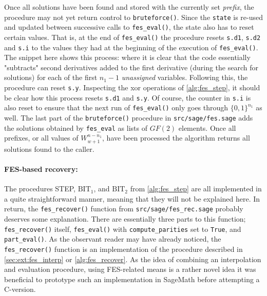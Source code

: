 Once all solutions have been found and stored with the currently set \textit{prefix}, the procedure may not yet return control to \texttt{bruteforce()}. Since the \texttt{state} is re-used and updated between successive calls to \texttt{fes\_eval()}, the state also has to reset certain values. That is, at the end of \texttt{fes\_eval()} the procedure resets \texttt{s.d1}, \texttt{s.d2} and \texttt{s.i} to the values they had at the beginning of the execution of \texttt{fes\_eval()}. The snippet here shows this process:
where it is clear that the code essentially "subtracts" second derivatives added to the first derivative (during the search for solutions) for each of the first $n_1-1$ \textit{unassigned} variables. Following this, the procedure can reset \texttt{s.y}. Inspecting the xor operations of \cref{alg:fes_step}, it should be clear how this process resets \texttt{s.d1} and \texttt{s.y}. Of course, the counter in \texttt{s.i} is also reset to ensure that the next run of \texttt{fes\_eval()} only goes through $\{0,1\}^{n_1}$ as well. 
The last part of the \texttt{bruteforce()} procedure in \texttt{src/sage/fes.sage} adds the solutions obtained by \texttt{fes\_eval} as lists of $GF(2)$ elements. Once all prefixes, or all values of $W^{n - n_1}_{w + 1}$, have been processed the algorithm returns all solutions found to the caller.

\paragraph{FES-based recovery:} The procedures STEP, $\text{BIT}_1$, and $\text{BIT}_2$ from \cref{alg:fes_step} are all implemented in a quite straightforward manner, meaning that they will not be explained here. In return, the \texttt{fes\_recover()} function from \texttt{src/sage/fes\_rec.sage} probably deserves some explanation. There are essentially three parts to this function; \texttt{fes\_recover()} itself, \texttt{fes\_eval()} with \texttt{compute\_parities} set to \texttt{True}, and \texttt{part\_eval()}. As the observant reader may have already noticed, the \texttt{fes\_recover()} function is an implementation of the procedure described in \cref{sec:ext:fes_interp} or \cref{alg:fes_recover}. As the idea of combining an interpolation and evaluation procedure, using FES-related means is a rather novel idea it was beneficial to prototype such an implementation in SageMath before attempting a C-version. 

